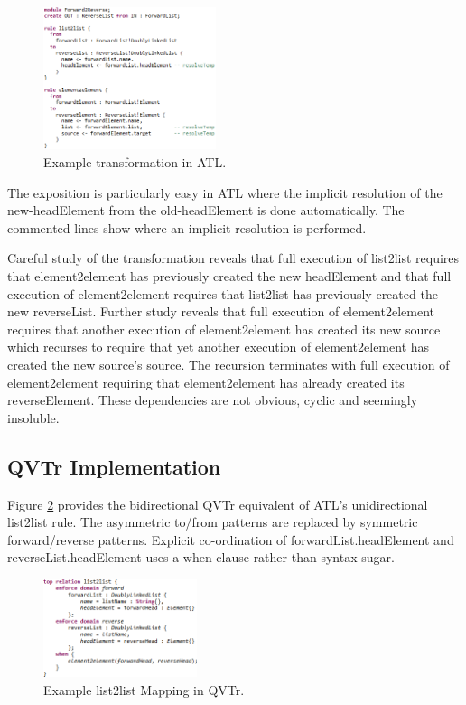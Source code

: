 \documentclass[conference]{IEEEtran}
\begin{document}
\begin{figure}[h]
	\centering
	\includegraphics[width=0.45\textwidth]{Forward2Reverse-ATL.png}
	\caption{Example transformation in ATL.}
	\label{fig:Forward2Reverse-ATL}
\end{figure}

The exposition is particularly easy in ATL where the implicit resolution of the new-headElement from the old-headElement is done automatically. The commented lines show where an implicit resolution is performed.

Careful study of the transformation reveals that full execution of list2list requires that element2element has previously created the new headElement and that full execution of element2element requires that list2list has previously created the new reverseList. Further study reveals that full execution of element2element requires that another execution of element2element has created its new source which recurses to require that yet another execution of element2element has created the new source's source. The recursion terminates with full execution of element2element requiring that element2element has already created its reverseElement. These dependencies are not obvious, cyclic and seemingly insoluble.

\subsection{QVTr Implementation}

Figure \ref{fig:List2List-QVTr} provides the bidirectional QVTr equivalent of ATL's unidirectional list2list rule. The asymmetric to/from patterns are replaced by symmetric forward/reverse patterns. Explicit co-ordination of forwardList.headElement and reverseList.headElement uses a when clause rather than syntax sugar.

\begin{figure}[h]
	\centering
	\includegraphics[width=0.4\textwidth]{List2List-QVTr.png}
	\caption{Example list2list Mapping in QVTr.}
	\label{fig:List2List-QVTr}
\end{figure}
\end{document}
